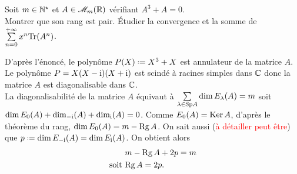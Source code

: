 \begin{exercice}
    Soit $m \in \mathbb{N}^\star$ et $A \in \mathscr{M}_m(\mathbb{R})$ vérifiant $A^3 + A = 0$.\\
    Montrer que son rang est pair. Étudier la convergence et la somme de $\sum\limits_{n=0}^{+\infty} x^n \mathrm{Tr} (A^n)$.
\end{exercice}

\begin{solution}
    D'après l'énoncé, le polynôme $P(X) \defeq X^3 + X$ est annulateur de la matrice $A$. Le polynôme $P = X(X-\mathrm{i})(X+\mathrm{i})$ est scindé à racines simples dans $\mathbb{C}$ donc la matrice $A$ est diagonalisable dans $\mathbb{C}$. \\
    La diagonalisabilité de la matrice $A$ équivaut à $\sum\limits_{\lambda \in \mathrm{Sp} A} \dim E_\lambda(A) = m$ soit $\dim E_0(A) + \dim_{-\mathrm{i}}(A) + \dim_{\mathrm{i}}(A) = 0$. Comme $E_0(A) = \mathrm{Ker}\, A$, d'après le théorème du rang, $\dim E_0(A) = m - \mathrm{Rg}\, A$. On sait aussi (\textcolor{red}{à détailler peut être}) que $p \defeq \dim E_{-\mi}(A) = \dim E_{\mi}(A)$. On obtient alors
    \begin{align*}
        & m - \mathrm{Rg}\, A + 2p = m \\
        \text{soit } & \mathrm{Rg}\, A = 2p.
    \end{align*}
\end{solution}